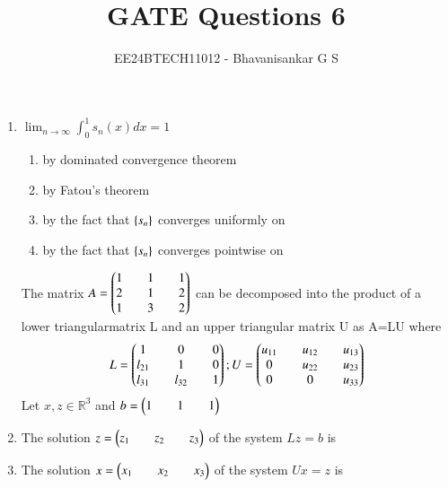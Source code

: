 \documentclass[journal,12pt,onecolumn]{IEEEtran}
\theoremstyle{remark}
\begin{document}

\vspace{3cm}

\title{GATE Questions 6}
\author{EE24BTECH11012 - Bhavanisankar G S}
\maketitle
\newpage
\bigskip

\renewcommand{\thefigure}{\theenumi}
\renewcommand{\thetable}{\theenumi}
\begin{enumerate}
	\item $\lim_{n \to \infty} \int_{0}^{1} s_n(x) dx = 1 $
		\begin{enumerate}
			\item by dominated convergence theorem
			\item by Fatou's theorem
			\item by the fact that $\left\{s_n\right\}$ converges uniformly on 
			\item by the fact that $\left\{s_n\right\}$ converges pointwise on 
		\end{enumerate}
	The matrix $A = \begin{pmatrix}1 && 1 && 1 \\ 2 && 1 && 2 \\ 1 && 3 && 2 \end{pmatrix}$ can be decomposed into the product of a lower triangularmatrix L and an upper triangular matrix U as A=LU where
		$$ L = \begin{pmatrix}1 && 0 && 0 \\ l_{21} && 1 && 0 \\ l_{31} && l_{32} && 1\end{pmatrix} ; U = \begin{pmatrix}u_{11} && u_{12} && u_{13} \\ 0 && u_{22} && u_{23} \\ 0 && 0 && u_{33} \end{pmatrix} $$
		Let $x, z \in \mathbb{R}^3$ and $b = \begin{pmatrix}1 && 1 && 1\end{pmatrix}$
	\item The solution $z = \begin{pmatrix}z_1 && z_2 && z_3\end{pmatrix}$ of the system $Lz=b$ is
		\begin{enumerate}
		\end{enumerate}
	\item The solution $x = \begin{pmatrix}x_1 && x_2 && x_3\end{pmatrix}$ of the system $Ux=z$ is
		\begin{enumerate}

\end{enumerate}
\end{enumerate}
\end{document}
